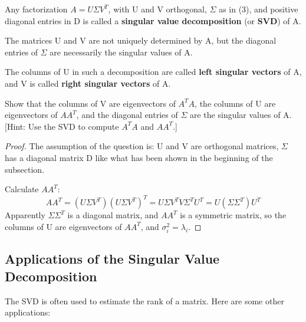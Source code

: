 \begin{definition}
    Any factorization \(A = U\Sigma V^T\), with U and V orthogonal, \(\Sigma \) as in (3), and positive diagonal entries in D is called a \textbf{singular value decomposition} (or \textbf{SVD}) of A. 
\end{definition}

The matrices U and V are not uniquely determined by A, but the diagonal entries of \(\Sigma\) are necessarily the singular values of A. 

The columns of U in such a decomposition are called \textbf{left singular vectors} of A, and V is called \textbf{right singular vectors} of A. 

\begin{problem}
    Show that the columns of V are eigenvectors of \(A^TA\), the columns of U are eigenvectors of \(AA^T\), and the diagonal entries of \(\Sigma\)  are the singular values of A.  
    [Hint: Use the SVD to compute \(A^TA\) and \(AA^T\).]
\end{problem}
\begin{proof}
    The assumption of the question is: U and V are orthogonal matrices, \(\Sigma\) has a diagonal matrix D like what has been shown in the beginning of the subsection. 

    Calculate \(AA^T\):
    \[
        AA^T = (U\Sigma V^T)(U\Sigma V^T)^T
            = U\Sigma V^T V \Sigma^T U^T
            = U (\Sigma \Sigma^T) U^T
    \] 
    Apparently \(\Sigma \Sigma^T\) is a diagonal matrix, and \(AA^T\) is a symmetric matrix, so the columns of U are eigenvectors of \(AA^T\), and \(\sigma_i^2 = \lambda_i\).  
\end{proof}

\subsection{Applications of the Singular Value Decomposition}

The SVD is often used to estimate the rank of a matrix.
Here are some other applications:

